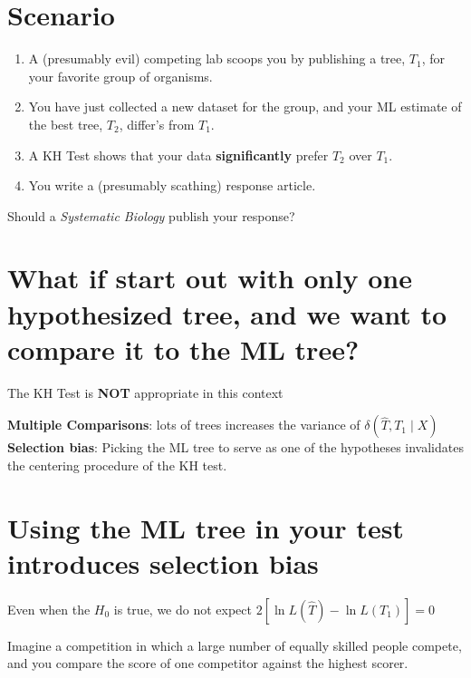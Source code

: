 \myNewSlide
\section*{Scenario}\normalsize
\begin{enumerate}
    \item A (presumably evil) competing lab scoops you by publishing a tree, $T_1$, for your favorite group of organisms.
    \item You have just collected a new dataset for the group, and your ML estimate of the best tree, $T_2$, differ's from $T_1$.
    \item A KH Test shows that your data {\bf significantly} prefer $T_2$ over $T_1$.
    \item You write a (presumably scathing) response article.
\end{enumerate}
Should a {\em Systematic Biology} publish your response?

\myNewSlide\large
\section*{What if start out with only one hypothesized tree, and we want to compare it to the ML tree?}
The KH Test is {\bf NOT} appropriate in this context \citep[see][for discussion of this point]{GoldmanAR2000}
    
{\bf Multiple Comparisons}: lots of trees increases the variance of $\delta(\hat{T},T_1 \mid X)$\\

{\bf Selection bias}: Picking the ML tree to serve as one of the hypotheses invalidates the centering procedure of the KH test.

\myNewSlide
\section*{Using the ML tree in your test introduces selection bias}
Even when the $H_0$ is true, we do not expect $2\left[\ln L(\hat{T}) - \ln L(T_1)\right]= 0$

Imagine a competition in which a large number of equally skilled people compete, and you compare the score of one competitor against the highest scorer.

